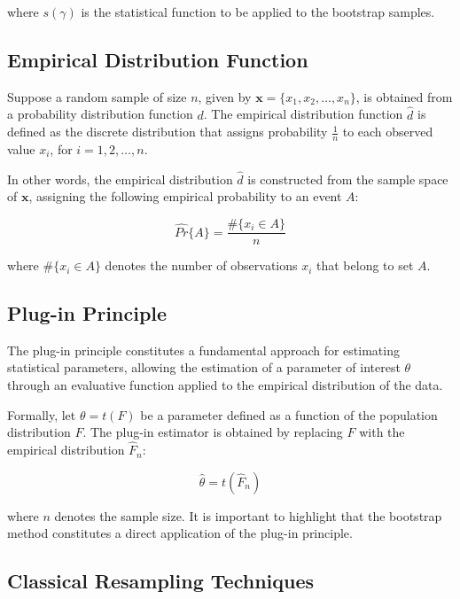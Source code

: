 \documentclass[12pt]{article}
\begin{document}
\noindent where $s(\gamma)$ is the statistical function to be applied to the bootstrap samples.

\subsection{Empirical Distribution Function}

Suppose a random sample of size $n$, given by $\mathbf{x} = \{x_1, x_2, \ldots, x_n\}$, is obtained from a probability distribution function $d$. The empirical distribution function $\hat{d}$ is defined as the discrete distribution that assigns probability $\frac{1}{n}$ to each observed value $x_i$, for $i = 1, 2, \ldots, n$.

In other words, the empirical distribution $\hat{d}$ is constructed from the sample space of $\mathbf{x}$, assigning the following empirical probability to an event $A$:

\begin{equation}
\hat{Pr}\{A\} = \frac{\#\{x_i \in A\}}{n}
\end{equation}

\noindent where $\#\{x_i \in A\}$ denotes the number of observations $x_i$ that belong to set $A$.

\subsection{Plug-in Principle}

The plug-in principle constitutes a fundamental approach for estimating statistical parameters, allowing the estimation of a parameter of interest $\theta$ through an evaluative function applied to the empirical distribution of the data.

Formally, let $\theta = t(F)$ be a parameter defined as a function of the population distribution $F$. The plug-in estimator is obtained by replacing $F$ with the empirical distribution $\hat{F}_n$:

\begin{equation}
\hat{\theta} = t(\hat{F}_n)
\end{equation}

\noindent where $n$ denotes the sample size. It is important to highlight that the bootstrap method constitutes a direct application of the plug-in principle.\cite{Efron:1997,Fernandez:1999}

\subsection{Classical Resampling Techniques}
\end{document}
